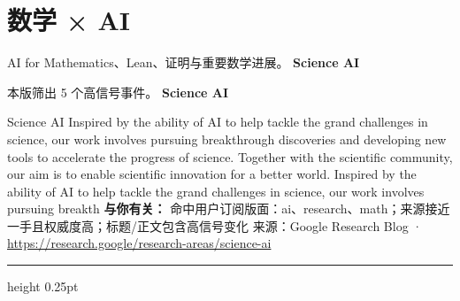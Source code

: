 \documentclass[10.5pt]{ctexart}
\begin{document}
\section*{数学 × AI}
{\color{ormuted} AI for Mathematics、Lean、证明与重要数学进展。}
\vspace{2mm}
{\LARGE\bfseries Science AI}\par
\vspace{1mm}
{\color{ormuted} 本版筛出 5 个高信号事件。}
\vspace{3mm}
{\Large\bfseries Science AI}\par
Science AI Inspired by the ability of AI to help tackle the grand challenges in science, our work involves pursuing breakthrough discoveries and developing new tools to accelerate the progress of science. Together with the scientific community, our aim is to enable scientific innovation for a better world. Inspired by the ability of AI to help tackle the grand challenges in science, our work involves pursuing breakth
\textbf{与你有关：} 命中用户订阅版面：ai、research、math；来源接近一手且权威度高；标题/正文包含高信号变化
{\footnotesize\color{ormuted} 来源：Google Research Blog · \url{https://research.google/research-areas/science-ai}}
\vspace{4mm}
\hrule height 0.25pt
\vspace{3mm}
\end{document}
